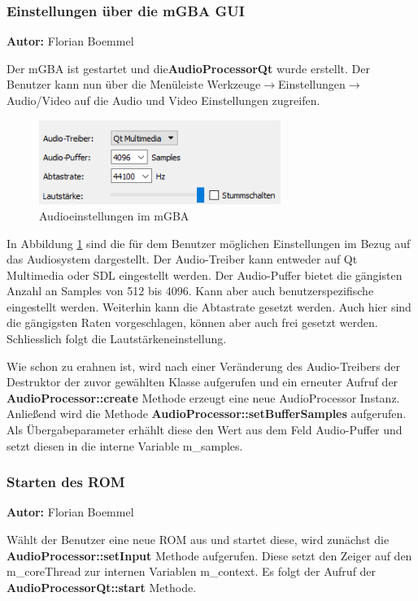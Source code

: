 \documentclass[11pt,a4paper]{scrartcl}
\newcommand{\AutorFlorian} {
    \vspace{-4mm}
    \large \textbf{Autor:} Florian Boemmel \normalsize
    \vspace{2mm}
}
\begin{document}
\subsubsection{Einstellungen \"uber die mGBA GUI} \label{kapitelEinstellungenMGBA}
\AutorFlorian

Der mGBA ist gestartet und die\textbf{AudioProcessorQt} wurde erstellt. Der Benutzer kann nun \"uber die Men\"uleiste Werkzeuge$\rightarrow$Einstellungen$\rightarrow$Audio/Video auf die Audio und Video Einstellungen zugreifen.

\begin{figure}[h!]
    \centering
    \includegraphics[width=0.7\textwidth]{Audioeinstellungen}
    \caption{Audioeinstellungen im mGBA}
    \label{fig:audioeinstellungen}
\end{figure}

In Abbildung \ref{fig:audioeinstellungen} sind die f\"ur dem Benutzer m\"oglichen Einstellungen im Bezug auf das Audiosystem dargestellt. Der Audio-Treiber kann entweder auf Qt Multimedia oder SDL eingestellt werden.
Der Audio-Puffer bietet die g\"angisten Anzahl an Samples von 512 bis 4096. Kann aber auch benutzerspezifische eingestellt werden. Weiterhin kann die Abtastrate gesetzt werden. Auch hier sind die g\"angigsten Raten vorgeschlagen, k\"onnen
aber auch frei gesetzt werden. Schlie{ss}lich folgt die Lautst\"arkeneinstellung.

Wie schon zu erahnen ist, wird nach einer Ver\"anderung des Audio-Treibers der Destruktor der zuvor gew\"ahlten Klasse aufgerufen und ein erneuter Aufruf der \textbf{AudioProcessor::create} Methode erzeugt eine neue AudioProcessor Instanz.
Anlie{\ss}end wird die Methode \textbf{AudioProcessor::setBufferSamples} aufgerufen. Als \"Ubergabeparameter erh\"ahlt diese den Wert aus dem Feld Audio-Puffer und setzt diesen in die interne Variable m\_samples.
\newpage


\subsubsection{Starten des ROM}
\AutorFlorian

W\"ahlt der Benutzer eine neue ROM aus und startet diese, wird zun\"achst die \textbf{AudioProcessor::setInput} Methode aufgerufen. Diese setzt den Zeiger auf den m\_coreThread zur internen Variablen m\_context. Es folgt der Aufruf der
\textbf{AudioProcessorQt::start} Methode.
\end{document}
